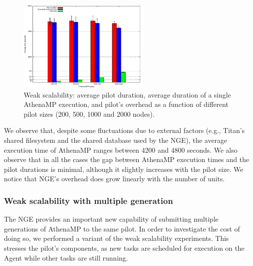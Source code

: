 \begin{figure}[!htb]
        \includegraphics[height=4.5cm,width=\columnwidth]{./figures/NGE/weak1.pdf}
    \caption{Weak scalability: average pilot duration, average  duration of a
    single AthenaMP execution, and pilot's overhead as a function of different pilot sizes (200, 500, 1000 and 2000 nodes).}
\label{fig:weakScal1a}
\end{figure}

We %
observe that, despite some fluctuations due to external factors
(e.g., Titan's shared filesystem and the shared database used by the NGE), the
average execution time of AthenaMP %
ranges between 4200 and 4800 seconds. %
We %
also observe that in all the cases the gap between AthenaMP execution times and
the pilot durations is minimal, although it slightly increases with the pilot
size. %
We %
notice that NGE's overhead does grow linearly with the number of units.




\subsubsection{Weak scalability with multiple generation }

The NGE provides an important new capability of submitting multiple
generations of AthenaMP to the same pilot. In order to investigate the cost of
doing so, we performed a variant of the weak scalability experiments. This
stresses the pilot's components, as new tasks are scheduled for execution on
the Agent while other tasks are still running.


